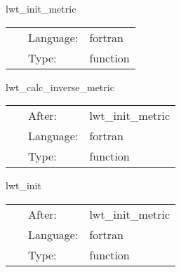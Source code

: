 \documentclass{article}
\begin{document}
\vspace{5mm}


\hspace{5mm} lwt\_init\_metric 

\hspace{5mm}{\it initialise the metric } 


\hspace{5mm}

 \begin{tabular*}{160mm}{cll} 
~ & Language:  & fortran \\ 
~ & Type:  & function \\ 
\end{tabular*} 


\vspace{5mm}


\hspace{5mm} lwt\_calc\_inverse\_metric 

\hspace{5mm}{\it transform the metric } 


\hspace{5mm}

 \begin{tabular*}{160mm}{cll} 
~ & After:  & lwt\_init\_metric \\ 
~ & Language:  & fortran \\ 
~ & Type:  & function \\ 
\end{tabular*} 


\vspace{5mm}


\hspace{5mm} lwt\_init 

\hspace{5mm}{\it initialise the system } 


\hspace{5mm}

 \begin{tabular*}{160mm}{cll} 
~ & After:  & lwt\_init\_metric \\ 
~ & Language:  & fortran \\ 
~ & Type:  & function \\ 
\end{tabular*} 


\vspace{5mm}
\end{document}
